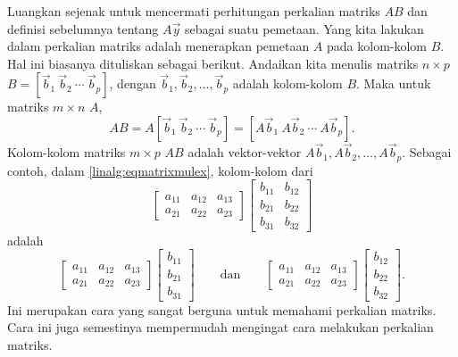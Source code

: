 Luangkan sejenak untuk mencermati perhitungan perkalian matriks $AB$
dan
definisi sebelumnya tentang $A\vec{y}$ sebagai suatu pemetaan.
Yang kita lakukan dalam perkalian matriks adalah menerapkan
pemetaan $A$ pada kolom-kolom $B$. Hal ini biasanya dituliskan sebagai berikut.
Andaikan kita menulis matriks $n \times p$
$B = [ \vec{b}_1 ~ \vec{b}_2 ~ \cdots ~ \vec{b}_p ]$, dengan
$\vec{b}_1, \vec{b}_2, \ldots, \vec{b}_p$ adalah kolom-kolom $B$. Maka
untuk matriks $m \times n$ $A$,
\begin{equation*}
AB =
A [ \vec{b}_1 ~ \vec{b}_2 ~ \cdots ~ \vec{b}_p ]
=
[ A\vec{b}_1 ~ A\vec{b}_2 ~ \cdots ~ A\vec{b}_p ] .
\end{equation*}
Kolom-kolom matriks $m \times p$ $AB$
adalah
vektor-vektor $A\vec{b}_1, A\vec{b}_2, \ldots, A\vec{b}_p$.
Sebagai contoh, dalam \eqref{linalg:eqmatrixmulex},
kolom-kolom dari
\begin{equation*}
\begin{bmatrix}
a_{11} & a_{12} & a_{13} \\
a_{21} & a_{22} & a_{23}
\end{bmatrix}
\begin{bmatrix}
b_{11} & b_{12} \\
b_{21} & b_{22} \\
b_{31} & b_{32}
\end{bmatrix}
\end{equation*}
adalah
\begin{equation*}
\begin{bmatrix}
a_{11} & a_{12} & a_{13} \\
a_{21} & a_{22} & a_{23}
\end{bmatrix}
\begin{bmatrix}
b_{11} \\
b_{21} \\
b_{31}
\end{bmatrix}
\qquad
\text{dan}
\qquad
\begin{bmatrix}
a_{11} & a_{12} & a_{13} \\
a_{21} & a_{22} & a_{23}
\end{bmatrix}
\begin{bmatrix}
b_{12} \\
b_{22} \\
b_{32}
\end{bmatrix} .
\end{equation*}
Ini merupakan cara yang sangat berguna untuk memahami perkalian matriks.
Cara ini juga semestinya mempermudah mengingat cara melakukan perkalian matriks.

